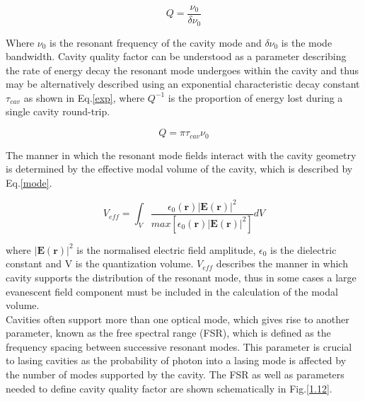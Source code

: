 \begin{equation}\label{Q-fac}
Q = \frac{\nu_{0}}{\delta\nu_{0}}
\end{equation}

Where $\nu_{0}$ is the resonant frequency of the cavity mode and $\delta\nu_{0}$ is the mode bandwidth. Cavity quality factor can be understood as a parameter describing the rate of energy decay the resonant mode undergoes within the cavity and thus may be alternatively described using an exponential characteristic decay constant $\tau_{cav}$ as shown in Eq.\ref{exp}, where $Q^{-1}$ is the proportion of energy lost during a single cavity round-trip.

\begin{equation}\label{exp}
Q = \pi\tau_{cav} \nu_{0}
\end{equation}

The manner in which the resonant mode fields interact with the cavity geometry is determined by the effective modal volume of the cavity, which is described by Eq.\ref{mode}.

\begin{equation}\label{mode}
V_{eff}= \int_{V}\frac{\epsilon_{0}(\mathbf{r})|\mathbf{E}(\mathbf{r})|^{2}}{max[\epsilon_{0}(\mathbf{r})|\mathbf{E}(\mathbf{r})|^{2}]}dV
\end{equation}

where $|\mathbf{E}(\mathbf{r})|^{2}$ is the normalised electric field amplitude, $\epsilon_{0}$ is the dielectric constant and V is the quantization volume. $V_{eff}$ describes the manner in which cavity supports the distribution of the resonant mode, thus in some cases a large evanescent field component must be included in the calculation of the modal volume.
\\ Cavities often support more than one optical mode, which gives rise to another parameter, known as the free spectral range  (FSR), which is defined as the frequency spacing between successive resonant modes. This parameter is crucial to lasing cavities as the probability of photon into a lasing mode is affected by the number of modes supported by the cavity. The FSR as well as parameters needed to define cavity quality factor are shown schematically in Fig.\ref{1.12}. 

